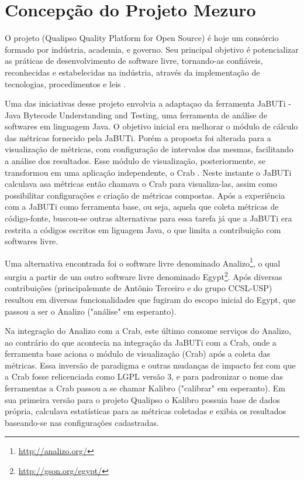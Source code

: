 \section{Concepção do Projeto Mezuro}

O projeto (Qualipso Quality Platform for Open Source) é hoje um consórcio formado por indústria, academia, e governo. Seu principal objetivo é potencializar as práticas de desenvolvimento de software livre, tornando-as confiáveis, reconhecidas e estabelecidas na indústria, através da implementação de tecnologias, procedimentos e leis \cite{qualipso2009}. 
	
Uma das iniciativas desse projeto envolvia  a adaptaçao da ferramenta JaBUTi - Java Bytecode Understanding and Testing, uma ferramenta de análise de softwares em linguagem Java. O objetivo inicial era melhorar o módulo de cálculo das métricas fornecido pela JaBUTi. Porém a proposta foi alterada para a visualização de métricas, com configuração de intervalos das mesmas, facilitando a análise dos resultados. Esse módulo de visualização, posteriormente, se transformou em uma aplicação independente, o Crab \cite{meirelles2009crab}. Neste instante o JaBUTi calculava asa métricas então chamava o Crab para visualiza-las, assim como possibilitar configurações e criação de métricas compostas. Após a experiência com a JaBUTi como ferramenta base, ou seja, aquela que coleta métricas de código-fonte, buscou-se outras alternativas para essa tarefa já que a JaBUTi era restrita a códigos escritos  em liguagem Java, o que limita a contribuição com softwares livre.

Uma alternativa encontrada foi o software livre denominado Analizo\footnote{\url{http://analizo.org/}}, o qual surgiu a partir de um outro software livre denominado Egypt\footnote{\url{http://gson.org/egypt/}}. Após diversas contribuições (principalemnte de Antônio Terceiro e do grupo CCSL-USP) resultou em diversas funcionalidades que fugiram do escopo inicial do Egypt, que passou a ser o Analizo ("análise" em esperanto). %

Na integração do Analizo com a Crab, este último consome serviços do Analizo, ao contrário do que acontecia na integração da JaBUTi com a Crab, onde a ferramenta base aciona o módulo de visualização (Crab) após a coleta das métricas. Essa inversão de paradigma e outras mudanças de impacto fez com que a Crab fosse relicenciada como LGPL versão 3, e para padronizar o nome das ferramentas a Crab passou a se chamar Kalibro ("calibrar" em esperanto). Em sua primeira versão para o projeto Qualipso o Kalibro possuia base de dados própria, calculava estatísticas para as métricas coletadas e exibia os resultados baseando-se nas configurações cadastradas. 

